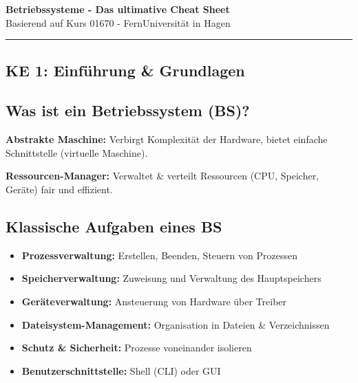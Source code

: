 \documentclass[9pt,a4paper]{extarticle}
\begin{document}
\begin{center}
{\huge\textbf{Betriebssysteme - Das ultimative Cheat Sheet}}\\
\vspace{2mm}
{\large Basierend auf Kurs 01670 - FernUniversität in Hagen}
\end{center}

\vspace{3mm}
\hrule
\vspace{3mm}

\begin{multicols*}{2}
\small

\section{KE 1: Einführung \& Grundlagen}

\subsection{Was ist ein Betriebssystem (BS)?}
\textbf{Abstrakte Maschine:} Verbirgt Komplexität der Hardware, bietet einfache Schnittstelle (virtuelle Maschine).

\textbf{Ressourcen-Manager:} Verwaltet \& verteilt Ressourcen (CPU, Speicher, Geräte) fair und effizient.

\subsection{Klassische Aufgaben eines BS}
\begin{itemize}
\item \textbf{Prozessverwaltung:} Erstellen, Beenden, Steuern von Prozessen
\item \textbf{Speicherverwaltung:} Zuweisung und Verwaltung des Hauptspeichers
\item \textbf{Geräteverwaltung:} Ansteuerung von Hardware über Treiber
\item \textbf{Dateisystem-Management:} Organisation in Dateien \& Verzeichnissen
\item \textbf{Schutz \& Sicherheit:} Prozesse voneinander isolieren
\item \textbf{Benutzerschnittstelle:} Shell (CLI) oder GUI
\end{itemize}


\end{multicols*}
\end{document}
